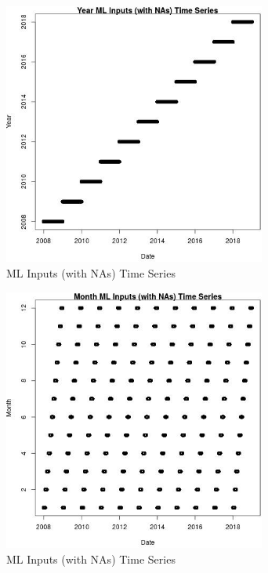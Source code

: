 \begin{figure} 
\centering  
\includegraphics[width=0.77\textwidth]{Code_Outputs/Report_ML_input_PM25_Step4_part_f_de_duplicated_aves_prioritize_24hr_obswNAs_YearvDate.jpg} 
\caption{\label{fig:Report_ML_input_PM25_Step4_part_f_de_duplicated_aves_prioritize_24hr_obswNAsYearvDate}ML Inputs (with NAs) Time Series} 
\end{figure} 
 

\begin{figure} 
\centering  
\includegraphics[width=0.77\textwidth]{Code_Outputs/Report_ML_input_PM25_Step4_part_f_de_duplicated_aves_prioritize_24hr_obswNAs_MonthvDate.jpg} 
\caption{\label{fig:Report_ML_input_PM25_Step4_part_f_de_duplicated_aves_prioritize_24hr_obswNAsMonthvDate}ML Inputs (with NAs) Time Series} 
\end{figure} 
 

